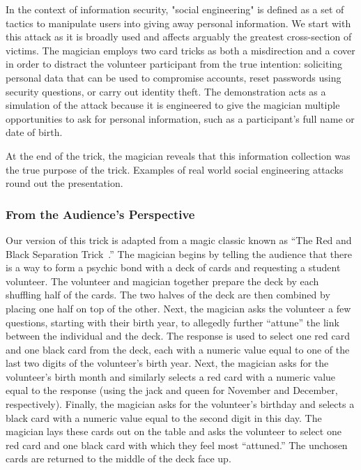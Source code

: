 In the context of information security,
"social engineering" is defined as a set
of tactics to manipulate users into giving away personal information.
We start with this attack as it is broadly used and affects arguably the
greatest cross-section of victims.  The magician employs two card tricks as both a misdirection and a cover in order to
distract the
volunteer participant from
the true intention: soliciting
personal data that
can be used to compromise accounts,
reset passwords using security questions, or
carry out identity theft. The  demonstration
acts as a simulation of the attack because it is engineered to give
the magician multiple opportunities to ask for personal information,
such as a participant's full name or date of birth.

At the end of the trick, the magician reveals that this information
collection was the true purpose of the trick.
Examples of real world social engineering attacks round out the
presentation.

\subsubsection{From the Audience's Perspective}

Our version of this trick is adapted from a magic classic
known as ``The Red and Black Separation Trick~\cite{redblackseparation}.''
The magician begins by
telling the audience that there
is a way to form a psychic bond with a deck of cards
and requesting a student volunteer.
The volunteer and magician
together prepare the deck
by each shuffling half of the cards.
The two halves of the deck are then combined by placing one half
on top of the other.
Next, the magician asks the volunteer
a few questions, starting with their birth year,
to allegedly further ``attune''
the link between the individual and the deck.
The response
is used to select one red card and one black card from the deck,
each with a numeric value equal to one of the last two digits of
the volunteer's birth year.
Next, the magician asks for the volunteer's birth month and similarly selects
a red card with a numeric value equal
to the response (using the jack and queen for November and December,
respectively).
Finally, the magician asks
for the volunteer's birthday and selects a black card with a numeric value
equal to the second digit in this day.
The magician lays these cards out on the table and asks the volunteer to select
one red card and one black card with which they feel most ``attuned.''
The unchosen cards are returned to the middle
of the deck face up.


